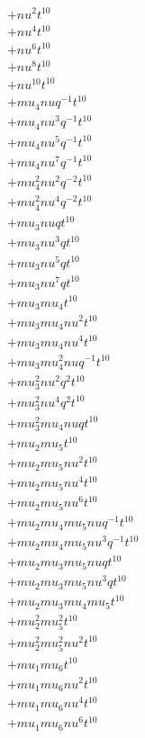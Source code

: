 \begin{align*}
  + nu^{2} t^{10} \\
  + nu^{4} t^{10} \\
  + nu^{6} t^{10} \\
  + nu^{8} t^{10} \\
  + nu^{10} t^{10} \\
  + mu_4 nu q^{-1} t^{10} \\
  + mu_4 nu^{3} q^{-1} t^{10} \\
  + mu_4 nu^{5} q^{-1} t^{10} \\
  + mu_4 nu^{7} q^{-1} t^{10} \\
  + mu_4^{2} nu^{2} q^{-2} t^{10} \\
  + mu_4^{2} nu^{4} q^{-2} t^{10} \\
  + mu_3 nu q t^{10} \\
  + mu_3 nu^{3} q t^{10} \\
  + mu_3 nu^{5} q t^{10} \\
  + mu_3 nu^{7} q t^{10} \\
  + mu_3 mu_4 t^{10} \\
  + mu_3 mu_4 nu^{2} t^{10} \\
  + mu_3 mu_4 nu^{4} t^{10} \\
  + mu_3 mu_4^{2} nu q^{-1} t^{10} \\
  + mu_3^{2} nu^{2} q^{2} t^{10} \\
  + mu_3^{2} nu^{4} q^{2} t^{10} \\
  + mu_3^{2} mu_4 nu q t^{10} \\
  + mu_2 mu_5 t^{10} \\
  + mu_2 mu_5 nu^{2} t^{10} \\
  + mu_2 mu_5 nu^{4} t^{10} \\
  + mu_2 mu_5 nu^{6} t^{10} \\
  + mu_2 mu_4 mu_5 nu q^{-1} t^{10} \\
  + mu_2 mu_4 mu_5 nu^{3} q^{-1} t^{10} \\
  + mu_2 mu_3 mu_5 nu q t^{10} \\
  + mu_2 mu_3 mu_5 nu^{3} q t^{10} \\
  + mu_2 mu_3 mu_4 mu_5 t^{10} \\
  + mu_2^{2} mu_5^{2} t^{10} \\
  + mu_2^{2} mu_5^{2} nu^{2} t^{10} \\
  + mu_1 mu_6 t^{10} \\
  + mu_1 mu_6 nu^{2} t^{10} \\
  + mu_1 mu_6 nu^{4} t^{10} \\
  + mu_1 mu_6 nu^{6} t^{10} \\

\end{align*}
